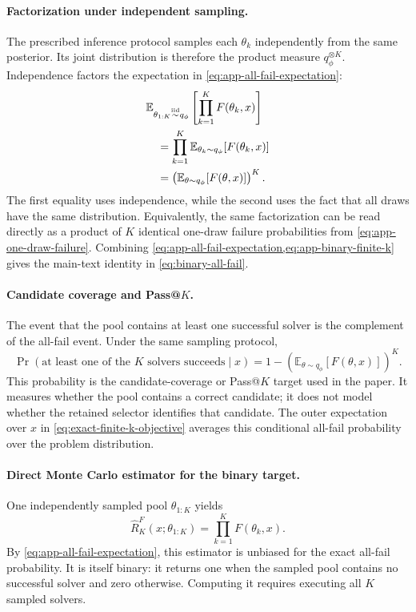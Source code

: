 \paragraph{Factorization under independent sampling.}
The prescribed inference protocol samples each $\theta_k$ independently from the same posterior.
Its joint distribution is therefore the product measure $q_\phi^{\otimes K}$.
Independence factors the expectation in \cref{eq:app-all-fail-expectation}:
\begin{align}
  &\mathbb E_{\theta_{1:K}\overset{\mathrm{iid}}{\sim}q_\phi}
  \left[\prod_{k=1}^K F(\theta_k,x)\right]
  \notag\\
  &\quad=
  \prod_{k=1}^K
  \mathbb E_{\theta_k\sim q_\phi}[F(\theta_k,x)]
  \notag\\
  &\quad=
  \left(
    \mathbb E_{\theta\sim q_\phi}[F(\theta,x)]
  \right)^K.
  \label{eq:app-binary-finite-k}
\end{align}
The first equality uses independence, while the second uses the fact that all draws have the same distribution.
Equivalently, the same factorization can be read directly as a product of $K$ identical one-draw failure probabilities from \cref{eq:app-one-draw-failure}.
Combining \cref{eq:app-all-fail-expectation,eq:app-binary-finite-k} gives the main-text identity in \cref{eq:binary-all-fail}.

\paragraph{Candidate coverage and Pass@$K$.}
The event that the pool contains at least one successful solver is the complement of the all-fail event.
Under the same sampling protocol,
\begin{equation}
  \Pr(\text{at least one of the $K$ solvers succeeds}\mid x)
  =
  1-
  \left(
    \mathbb E_{\theta\sim q_\phi}[F(\theta,x)]
  \right)^K.
  \label{eq:app-pass-k}
\end{equation}
This probability is the candidate-coverage or Pass@$K$ target used in the paper.
It measures whether the pool contains a correct candidate; it does not model whether the retained selector identifies that candidate.
The outer expectation over $x$ in \cref{eq:exact-finite-k-objective} averages this conditional all-fail probability over the problem distribution.

\paragraph{Direct Monte Carlo estimator for the binary target.}
One independently sampled pool $\theta_{1:K}$ yields
\begin{equation}
  \widehat R_K^{F}(x;\theta_{1:K})
  =
  \prod_{k=1}^K F(\theta_k,x).
  \label{eq:app-hard-direct-estimator}
\end{equation}
By \cref{eq:app-all-fail-expectation}, this estimator is unbiased for the exact all-fail probability.
It is itself binary: it returns one when the sampled pool contains no successful solver and zero otherwise.
Computing it requires executing all $K$ sampled solvers.

